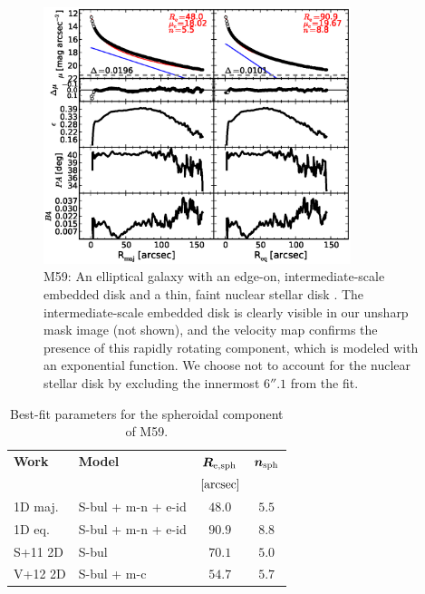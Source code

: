 \documentclass[preprint2]{emulateapj}
\newcommand{\fitfigurewidth}{0.8\textwidth}
\begin{document}
  \begin{figure}[h]
  \begin{center}
  \includegraphics[width=\fitfigurewidth]{images/m59_1Dfit.eps}
  \caption{M59:
  An elliptical galaxy with an edge-on, intermediate-scale embedded disk \citep{scorzabender1995}
  and a thin, faint nuclear stellar disk \citep{ferrarese2006acsvcs,ledo2010}. 
  The intermediate-scale embedded disk is clearly visible in our unsharp mask image (not shown), and 
  the velocity map confirms the presence of this rapidly rotating component, which is modeled with an exponential function.
  We choose not to account for the nuclear stellar disk by excluding the innermost $6''.1$ from the fit.  
  }
  \end{center}
  \end{figure}

  \begin{table}[h]
  \small
  \caption{Best-fit parameters for the spheroidal component of M59.}
  \begin{center}
  \begin{tabular}{llcc}
  \hline
  {\bf Work} & {\bf Model}   & $\bm R_{\rm e,sph}$    & $\bm n_{\rm sph}$ \\
    &  &  $[\rm arcsec]$ & \\
  \hline
  1D maj. & S-bul + m-n + e-id & $48.0$  &  $5.5$ \\
  1D eq.  & S-bul + m-n + e-id & $90.9$  &  $8.8$ \\
  \hline 
  S+11 2D         & S-bul       & $70.1$  &  $5.0$ \\
  V+12 2D         & S-bul + m-c & $54.7$  &  $5.7$ \\
  \hline
  \end{tabular}
  \end{center}
  \label{tab:m59}
  \end{table}
\end{document}
